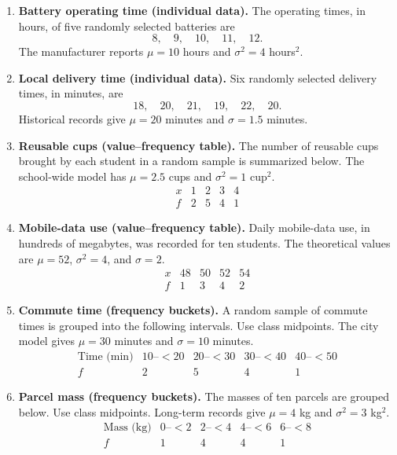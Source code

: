 \begin{enumerate}[
	leftmargin=*,
	itemsep=7pt,
	parsep=0pt,
	topsep=4pt
]

\item
\textbf{Battery operating time (individual data).}
The operating times, in hours, of five randomly selected batteries are
\[
	8,\quad 9,\quad 10,\quad 11,\quad 12.
\]
The manufacturer reports $\mu=10$ hours and $\sigma^2=4$ hours$^2$.

\item
\textbf{Local delivery time (individual data).}
Six randomly selected delivery times, in minutes, are
\[
	18,\quad 20,\quad 21,\quad 19,\quad 22,\quad 20.
\]
Historical records give $\mu=20$ minutes and $\sigma=1.5$ minutes.

\item
\textbf{Reusable cups (value--frequency table).}
The number of reusable cups brought by each student in a random sample is
summarized below. The school-wide model has $\mu=2.5$ cups and
$\sigma^2=1$ cup$^2$.
\[
\begin{array}{c|cccc}
	x & 1 & 2 & 3 & 4\\ \hline
	f & 2 & 5 & 4 & 1
\end{array}
\]

\item
\textbf{Mobile-data use (value--frequency table).}
Daily mobile-data use, in hundreds of megabytes, was recorded for ten
students. The theoretical values are $\mu=52$, $\sigma^2=4$, and $\sigma=2$.
\[
\begin{array}{c|cccc}
	x & 48 & 50 & 52 & 54\\ \hline
	f & 1 & 3 & 4 & 2
\end{array}
\]

\item
\textbf{Commute time (frequency buckets).}
A random sample of commute times is grouped into the following intervals.
Use class midpoints. The city model gives $\mu=30$ minutes and
$\sigma=10$ minutes.
\[
\begin{array}{c|cccc}
	\text{Time (min)} & 10\text{--}<20 & 20\text{--}<30 & 30\text{--}<40 & 40\text{--}<50\\ \hline
	f & 2 & 5 & 4 & 1
\end{array}
\]

\item
\textbf{Parcel mass (frequency buckets).}
The masses of ten parcels are grouped below. Use class midpoints. Long-term
records give $\mu=4$ kg and $\sigma^2=3$ kg$^2$.
\[
\begin{array}{c|cccc}
	\text{Mass (kg)} & 0\text{--}<2 & 2\text{--}<4 & 4\text{--}<6 & 6\text{--}<8\\ \hline
	f & 1 & 4 & 4 & 1
\end{array}
\]


\end{enumerate}
